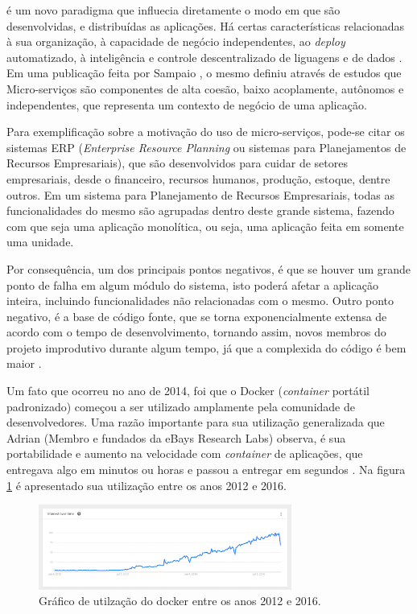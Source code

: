 \documentclass[journal]{IEEEtran}
\begin{document}
 é um novo paradigma que influecia diretamente o modo em que são desenvolvidas, e distribuídas as aplicações. Há certas características relacionadas à sua organização, à capacidade de negócio independentes, ao \emph{deploy} automatizado, à inteligência e controle descentralizado de liguagens e de dados \cite{JamesLewis}. Em uma publicação feita por Sampaio \cite{CleutonSampaio}, o mesmo definiu através de estudos que Micro-serviços são componentes de alta coesão, baixo acoplamente, autônomos e independentes, que representa um contexto de negócio de uma aplicação.

Para exemplificação sobre a motivação do uso de micro-serviços, pode-se citar os sistemas ERP (\emph{Enterprise Resource Planning} ou sistemas para Planejamentos de Recursos Empresariais), que são desenvolvidos para cuidar de setores empresariais, desde o financeiro, recursos humanos, produção, estoque, dentre outros. Em um sistema para Planejamento de Recursos Empresariais, todas as funcionalidades do mesmo são agrupadas dentro deste grande sistema, fazendo com que seja uma aplicação monolítica, ou seja, uma aplicação feita em somente uma unidade.

Por consequência, um dos principais pontos negativos, é que se houver um grande ponto de falha em algum módulo do sistema, isto poderá afetar a aplicação inteira, incluindo funcionalidades não relacionadas com o mesmo. Outro ponto negativo, é a base de código fonte, que se torna exponencialmente extensa de acordo com o tempo de desenvolvimento, tornando assim, novos membros do projeto improdutivo durante algum tempo, já que a complexida do código é bem maior \cite{AdrianoAlmeida}.

Um fato que ocorreu no ano de 2014, foi que o Docker (\emph{container} portátil padronizado) começou a ser utilizado amplamente pela comunidade de desenvolvedores. Uma razão importante para sua utilização generalizada que Adrian (Membro e fundados da eBays Research Labs) observa, é sua portabilidade e aumento na velocidade com \emph{container} de aplicações, que entregava algo em minutos ou horas e passou a entregar em segundos \cite{CristianoDiedrich}. Na figura \ref{fig:utilizacao-docker} é apresentado sua utilização entre os anos 2012 e 2016.

\begin{figure}[h]
\centering
\includegraphics[height=1.1in]{docker}
\caption{Gráfico de utilzação do docker entre os anos 2012 e 2016.}
\label{fig:utilizacao-docker}
\end{figure}
\end{document}
